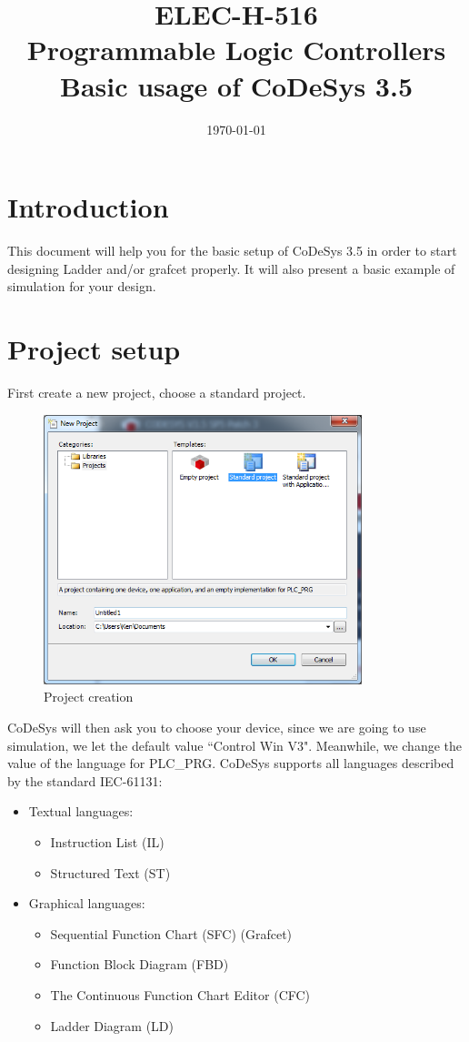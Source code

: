 \documentclass[10pt,a4paper]{article}
\date{\vspace{-1cm}\mydate\today}
\title{\vspace{-2cm} ELEC-H-516 \\ Programmable Logic Controllers \\
                                Basic usage of CoDeSys 3.5}
\begin{document}
\maketitle

\section{Introduction}
This document will help you for the basic setup of CoDeSys 3.5 in order to start designing Ladder and/or grafcet properly. It will also present a basic example of simulation for your design.

\section{Project setup}
First create a new project, choose a standard project.

\begin{figure}[h!]
	\begin{center}
		\includegraphics[width=350px]{img2.PNG}
	\end{center}
\caption{Project creation}
\label{fig:creation}
\end{figure}

CoDeSys will then ask you to choose your device, since we are going to use simulation, we let the default value ``Control Win V3".
Meanwhile, we change the value of the language for PLC\_PRG.
CoDeSys supports all languages described by the standard IEC-61131:

\begin{itemize}
\item Textual languages:
\begin{itemize}
\item Instruction List (IL)
\item Structured Text (ST)
\end{itemize}
\item Graphical languages:
\begin{itemize}
\item Sequential Function Chart (SFC) (Grafcet)
\item Function Block Diagram (FBD)
\item The Continuous Function Chart Editor (CFC)
\item Ladder Diagram (LD)
\end{itemize}
\end{itemize}
\end{document}
